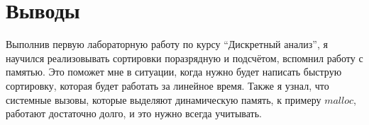 \section{Выводы}
{\itshape }

Выполнив первую лабораторную работу по курсу \enquote{Дискретный анализ}, я научился реализовывать сортировки поразрядную и подсчётом, вспомнил работу с памятью. Это поможет мне в ситуации, когда нужно будет написать быструю сортировку, которая будет работать за линейное время. Также я узнал, что системные вызовы, которые выделяют динамическую память, к примеру $malloc$, работают достаточно долго, и это нужно всегда учитывать.
\pagebreak
